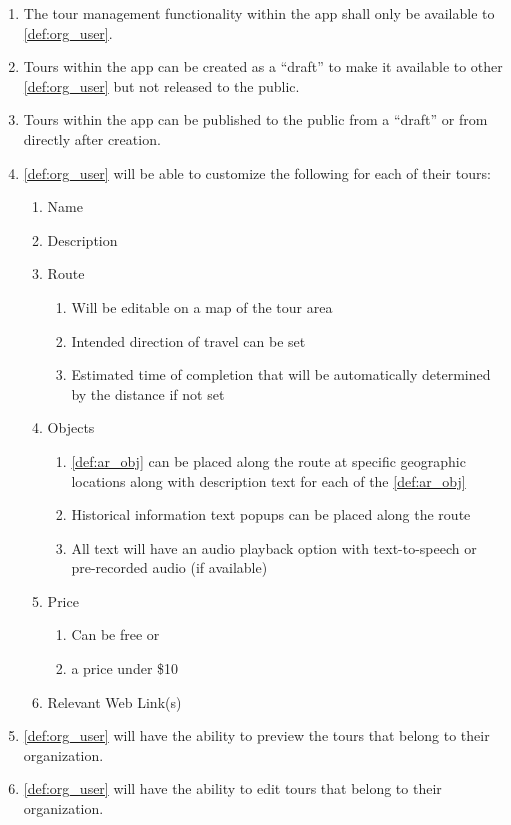 \documentclass{article}
\begin{document}
\begin{enumerate}[align=left, label=\textbf{TM-FR\arabic*:}]
    \item The tour management functionality within the app shall only be available to \ref{def:org_user}.
    \item Tours within the app can be created as a “draft” to make it available to other \ref{def:org_user} but not released to the public.
    \item Tours within the app can be published to the public from a “draft” or from directly after creation.
    \item \ref{def:org_user} will be able to customize the following for each of their tours:
    \begin{enumerate}
        \item Name
        \item Description
        \item Route
        \begin{enumerate}
            \item Will be editable on a map of the tour area
            \item Intended direction of travel can be set
            \item Estimated time of completion that will be automatically determined by the distance if not set
        \end{enumerate}
        \item Objects
        \begin{enumerate}
            \item \ref{def:ar_obj} can be placed along the route at specific geographic locations along with description text for each of the \ref{def:ar_obj}
            \item Historical information text popups can be placed along the route
            \item All text will have an audio playback option with text-to-speech or pre-recorded audio (if available)
        \end{enumerate}
        \item Price
        \begin{enumerate}
            \item Can be free or
            \item a price under \$10
        \end{enumerate}
        \item Relevant Web Link(s)
    \end{enumerate}
    \item \ref{def:org_user} will have the ability to preview the tours that belong to their organization.
    \item \ref{def:org_user} will have the ability to edit tours that belong to their organization.
\end{enumerate}
\end{document}

